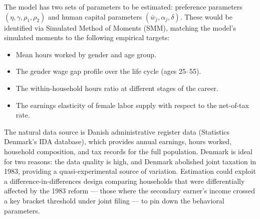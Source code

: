 The model has two sets of parameters to be estimated: preference parameters $(\eta, \gamma, \rho_1, \rho_2)$ and human capital parameters $(\bar{w}_j, \alpha_j, \delta)$.
These would be identified via Simulated Method of Moments (SMM), matching the model's simulated moments to the following empirical targets:

\begin{itemize}
    \item Mean hours worked by gender and age group.
    \item The gender wage gap profile over the life cycle (ages 25–55).
    \item The within-household hours ratio at different stages of the career.
    \item The earnings elasticity of female labor supply with respect to the net-of-tax rate.
\end{itemize}

The natural data source is Danish administrative register data (Statistics Denmark's IDA database), which provides annual earnings, hours worked, household composition, and tax records for the full population.
Denmark is ideal for two reasons: the data quality is high, and Denmark abolished joint taxation in 1983, providing a quasi-experimental source of variation.
Estimation could exploit a difference-in-differences design comparing households that were differentially affected by the 1983 reform — those where the secondary earner's income crossed a key bracket threshold under joint filing — to pin down the behavioral parameters.
